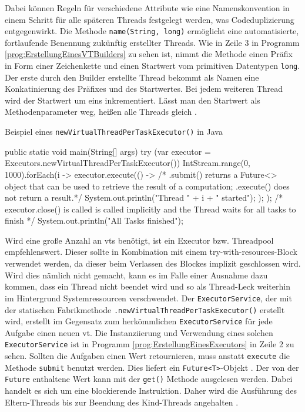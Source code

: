     Dabei können Regeln für verschiedene Attribute wie eine Namenskonvention
    in einem Schritt für alle späteren Threads festgelegt werden, was Codeduplizierung entgegenwirkt.
    Die Methode \texttt{name(String, long)} ermöglicht eine automatisierte, fortlaufende Benennung zukünftig erstellter Threads. Wie in Zeile 3 in Programm 
    \ref{prog:ErstellungEinesVTBuilders} zu sehen ist, nimmt die Methode einen Präfix in Form einer Zeichenkette und einen Startwert vom primitiven
    Datentypen \texttt{long}. Der erste durch den Builder erstellte Thread bekommt als Namen eine Konkatinierung des Präfixes und des Startwertes. Bei jedem weiteren Thread wird der Startwert um eins inkrementiert. Lässt man den Startwert als Methodenparameter weg, heißen alle Threads gleich 
    \cite{oracle22Builder}. 

    \begin{program} [H]
        \caption{Beispiel eines \texttt{newVirtualThreadPerTaskExecutor()} in Java}
        \label{prog:ErstellungEinesExecutors}
    \begin{JavaCode}[language=Java, numbers=left]
public static void main(String[] args) {
    try (var executor = Executors.newVirtualThreadPerTaskExecutor()){
        IntStream.range(0, 1000).forEach(i -> {
            executor.execute(() -> {     
                /* .submit() returns a Future<> object that can be used to retrieve
                 the result of a computation; .execute() does not return a result.*/
                System.out.println("Thread " + i + " started");
            });
        });
    }       /* executor.close() is called is called implicitly and the Thread waits
             for all tasks to finish */
    System.out.println("All Tasks finished"); 
}\end{JavaCode}
    \end{program}

    Wird eine große Anzahl an \Glspl{vt} benötigt,  ist ein Executor bzw. Threadpool empfehlenswert. Dieser sollte in Kombination mit einem
    try-with-resources-Block verwendet werden, da dieser beim Verlassen des Blockes implizit geschlossen wird. Wird dies nämlich nicht gemacht, kann es
    im Falle einer Ausnahme dazu kommen, dass ein Thread nicht beendet wird und so als Thread-Leck weiterhin im Hintergrund Systemressourcen verschwendet.
    Der \texttt{ExecutorService}, der mit der statischen Fabrikmethode \texttt{.newVirtualThreadPerTaskExecutor()} erstellt wird, 
    erstellt im Gegensatz zum herkömmlichen \texttt{ExecutorService} für jede Aufgabe einen neuen \gls{vt}. Die Instanziierung und Verwendung eines solchen \texttt{ExecutorService} 
    ist in Programm \ref{prog:ErstellungEinesExecutors} in Zeile 2 zu sehen.
    Sollten die Aufgaben einen Wert retournieren, muss anstatt \texttt{execute} die Methode \texttt{submit} benutzt werden. Dies liefert ein \texttt{Future<T>}-Objekt 
    \cite{oracle21VritualThreads}.
    Der von der \texttt{Future} enthaltene Wert kann mit der
    \texttt{get()}  Methode ausgelesen werden. Dabei handelt es sich um eine blockierende Instruktion. Daher wird die Ausführung des Eltern-Threads bis zur
    Beendung des Kind-Threads angehalten \cite{oracle21Future}.
    


